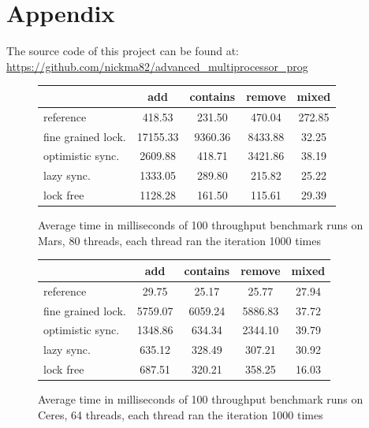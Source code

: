 \newpage
\section{Appendix}
The source code of this project can be found at:\\ \url{https://github.com/nickma82/advanced_multiprocessor_prog}

\begin{figure}[ht]
  \centering
\begin{tabular}{ l | c c c c }
 & add & contains & remove & mixed\\
 \hline
reference & 418.53 &  231.50 &  470.04  & 272.85\\
fine grained lock. & 17155.33 & 9360.36 & 8433.88 & 32.25 \\
optimistic sync. & 2609.88  & 418.71 & 3421.86 &   38.19\\
lazy sync. & 1333.05 &  289.80 &  215.82  &  25.22\\
lock free & 1128.28  & 161.50  & 115.61   & 29.39\\
\end{tabular}
  \caption{Average time in milliseconds of 100 throughput benchmark runs on Mars, 80 threads, each thread ran the iteration 1000 times}
  \label{mars_throughput}
\end{figure}

\begin{figure}[ht]
  \centering
\begin{tabular}{ l | c c c c }
 & add & contains & remove & mixed\\
 \hline
reference & 29.75  &  25.17  &  25.77 &   27.94 \\
fine grained lock. & 5759.07 & 6059.24 & 5886.83 & 37.72 \\
optimistic sync. & 1348.86 &  634.34 & 2344.10  &  39.79 \\
lazy sync. & 635.12  & 328.49 &  307.21  &  30.92 \\
lock free & 687.51  & 320.21 &  358.25  &  16.03\\
\end{tabular}
  \caption{Average time in milliseconds of 100 throughput benchmark runs on Ceres, 64 threads, each thread ran the iteration 1000 times}
  \label{ceres_throughput}
\end{figure}

